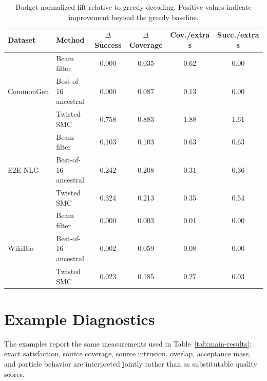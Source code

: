 \documentclass[11pt]{article}
\begin{document}
\begin{table}[H]
\centering
\caption{Budget-normalized lift relative to greedy decoding. Positive values indicate improvement beyond the greedy baseline.}
\label{tab:efficiency-deltas}
\begin{tabular}{llcccc}
\toprule
Dataset & Method & $\Delta$ Success & $\Delta$ Coverage & Cov./extra s & Succ./extra s \\
\midrule
\multirow{3}{*}{CommonGen}
& Beam filter & 0.000 & 0.035 & 0.62 & 0.00 \\
& Best-of-16 ancestral & 0.000 & 0.087 & 0.13 & 0.00 \\
& Twisted SMC & 0.758 & 0.883 & 1.88 & 1.61 \\
\midrule
\multirow{3}{*}{E2E NLG}
& Beam filter & 0.103 & 0.103 & 0.63 & 0.63 \\
& Best-of-16 ancestral & 0.242 & 0.208 & 0.31 & 0.36 \\
& Twisted SMC & 0.324 & 0.213 & 0.35 & 0.54 \\
\midrule
\multirow{3}{*}{WikiBio}
& Beam filter & 0.000 & 0.003 & 0.01 & 0.00 \\
& Best-of-16 ancestral & 0.002 & 0.059 & 0.08 & 0.00 \\
& Twisted SMC & 0.023 & 0.185 & 0.27 & 0.03 \\
\bottomrule
\end{tabular}
\end{table}

\section{Example Diagnostics}
\label{sec:example-diagnostics}


The examples report the same measurements used in Table~\ref{tab:main-results}: exact satisfaction, source coverage, source intrusion, overlap, acceptance mass, and particle behavior are interpreted jointly rather than as substitutable quality scores.
\end{document}
